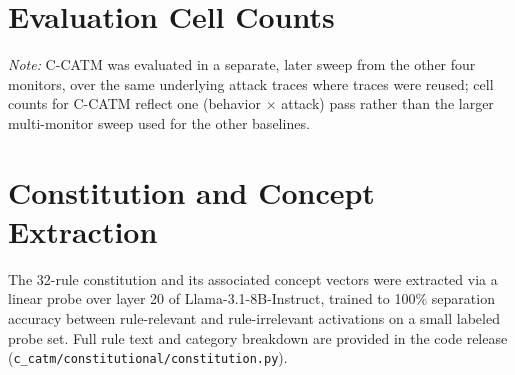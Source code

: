 \documentclass[11pt]{article}
\begin{document}
\appendix

\section{Evaluation Cell Counts}

\begin{table}[H]
\centering
{}
\end{table}

\noindent\emph{Note:} C-CATM was evaluated in a separate, later sweep from the other four monitors, over the same underlying attack traces where traces were reused; cell counts for C-CATM reflect one (behavior $\times$ attack) pass rather than the larger multi-monitor sweep used for the other baselines.

\section{Constitution and Concept Extraction}

The 32-rule constitution and its associated concept vectors were extracted via a linear probe over layer 20 of Llama-3.1-8B-Instruct, trained to 100\% separation accuracy between rule-relevant and rule-irrelevant activations on a small labeled probe set. Full rule text and category breakdown are provided in the code release (\texttt{c\_catm/constitutional/constitution.py}).



\end{document}
